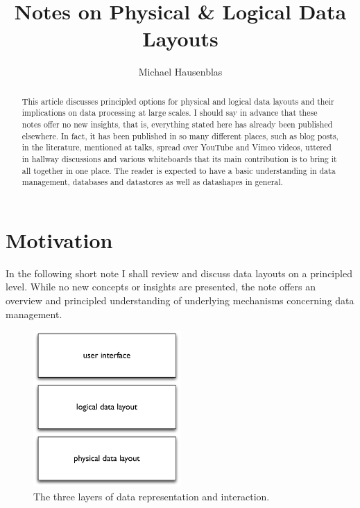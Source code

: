\documentclass{llncs}
\begin{document}
\title{Notes on Physical \& Logical Data Layouts}
	\author{
	Michael Hausenblas 
	}
\maketitle

\begin{abstract}
This article discusses principled options for physical and logical data layouts
and their implications on data processing at large scales. I should say in 
advance that these notes offer no new insights, that is, everything stated here 
has already been published elsewhere. In fact, it has been published in so many 
different places, such as blog posts, in the literature, mentioned at talks, 
spread over YouTube and Vimeo videos, uttered in hallway discussions and 
various whiteboards that its main contribution is to bring it all together in 
one place. The reader is expected to have a basic understanding in data 
management, databases and datastores as well as datashapes in general.
\end{abstract}

\section{Motivation}
\label{sec:mot}
In the following short note I shall review and discuss data layouts on a 
principled level. While no new concepts or insights are presented, the note
offers an overview and principled understanding of underlying mechanisms 
concerning data management.

\begin{figure}[h!]
\centering
\includegraphics[width=0.5\textwidth]{data-layers}
\caption{The three layers of data representation and interaction.}
\label{fig:data-layers}
\end{figure}
\end{document}
